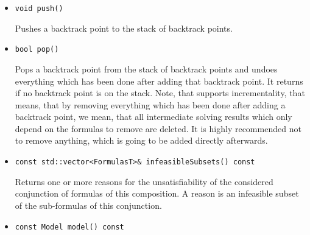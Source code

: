 \begin{itemize}
	but for NRA it is actually always possible to define a strategy for a complete \smtrat solver) or it
	communicates lemmas/tautologies, which can be obtained applying \texttt{lemmas()}. 
	If we embed, e.g., a theory solver composed with \smtrat into an
	SMT solver, these lemmas can be used in its sat solving process in the same way as infeasible subsets are 
	used. The strategy of an SMT solver composed with \smtrat has to involve a \satModule before any theory module
	is used\footnote{It is possible to define a strategy using conditions in a way, that we achieve an SMT solver, even if for some cases no \satModule is involved before a theory module is applied.} and, therefore, the SMT solver never communicates these lemmas as they are already processed by the
	\satModule. A better explanation on the modules and the strategy can be found in Chapter~\ref{chapter:generalframework} 
	and Chapter~\ref{chapter:composingats}. If the Boolean argument of the function \texttt{check} is \false, the composed solver is allowed to omit hard obstacles during solving at the cost of returning \UNKNOWN in more cases.
     \item \begin{verbatim}void push()\end{verbatim}
    	Pushes a backtrack point to the stack of backtrack points.
    \item \begin{verbatim}bool pop()\end{verbatim}
    	Pops a backtrack point from the stack of backtrack points and undoes everything
		which has been done after adding that backtrack point. It returns \false if no backtrack
		point is on the stack. Note, that \smtrat supports incrementality, that means, that by removing
		everything which has been done after adding a backtrack point, we mean, that all 
		intermediate solving results which only depend on the formulas to remove are deleted. It is highly
		recommended not to remove anything, which is going to be added directly afterwards.
    \item \begin{verbatim}const std::vector<FormulasT>& infeasibleSubsets() const\end{verbatim}
    	Returns one or more reasons for the unsatisfiability of the considered conjunction of 
    	formulas of this \smtrat composition. A reason
    	is an infeasible subset of the sub-formulas of this conjunction.
    \item \begin{verbatim}const Model model() const\end{verbatim}

\end{itemize}
